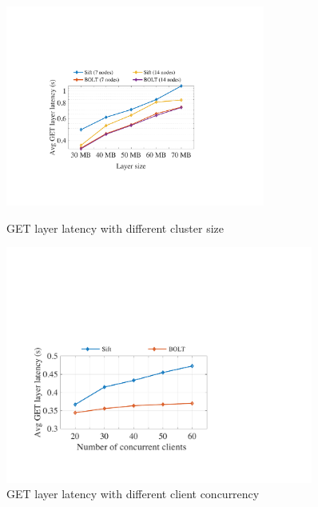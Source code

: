 \begin{figure}[t]
	\centering
	\begin{minipage}{0.3\textwidth}
		\centering
		\includegraphics[width=0.76\textwidth]{graphs/clusterscale.pdf}
		\caption{GET layer latency with different cluster size}
		\label{fig:eval-clusterscale}
	\end{minipage}%
	\hspace{1mm}
		\begin{minipage}{0.3\textwidth}
		\centering
		\includegraphics[width=0.9\textwidth]{graphs/clientscale.pdf}
		\caption{GET layer latency with different client concurrency}
		\label{fig:eval-clientscale}
	\end{minipage}%
	\hspace{1mm}
	\begin{minipage}{0.3\textwidth}
	\centering

\end{minipage}
\end{figure}
